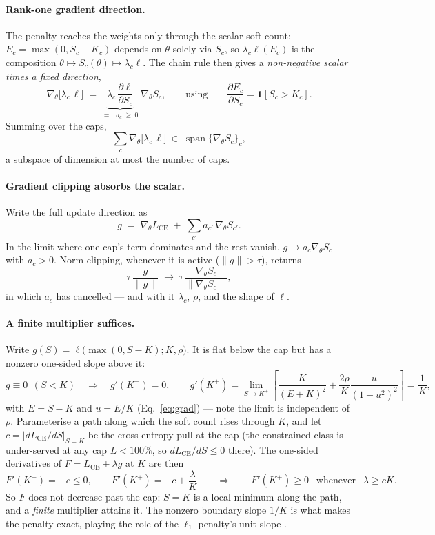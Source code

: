 \documentclass[10pt]{article}
\begin{document}
{\color{blue}
\paragraph{Rank-one gradient direction.}
The penalty reaches the weights only through the scalar soft count:
$E_c=\max(0,S_c-K_c)$ depends on $\theta$ solely via $S_c$, so
$\lambda_c\ell(E_c)$ is the composition
$\theta\mapsto S_c(\theta)\mapsto\lambda_c\ell$. The chain rule then gives a
\emph{non-negative scalar times a fixed direction},
\[
\nabla_\theta\bigl[\lambda_c\,\ell\bigr]
\;=\;
\underbrace{\lambda_c\,\frac{\partial\ell}{\partial S_c}}_{=:\;a_c\;\ge\;0}
\;\nabla_\theta S_c ,
\qquad\text{using}\qquad
\frac{\partial E_c}{\partial S_c}=\mathbf 1[S_c>K_c] .
\]
Summing over the caps,
\[
\sum_c \nabla_\theta\bigl[\lambda_c\,\ell\bigr]
\;\in\;
\operatorname{span}\{\nabla_\theta S_c\}_c ,
\]
a subspace of dimension at most the number of caps.
}

{\color{blue}
\paragraph{Gradient clipping absorbs the scalar.}
Write the full update direction as
\[
g \;=\; \nabla_\theta L_{\text{CE}} \;+\; \sum_{c'} a_{c'}\,\nabla_\theta S_{c'} .
\]
In the limit where one cap's term dominates and the rest vanish, $g\to a_c\nabla_\theta S_c$
with $a_c>0$. Norm-clipping, whenever it is active ($\lVert g\rVert>\tau$), returns
\[
\tau\,\frac{g}{\lVert g\rVert}
\;\longrightarrow\;
\tau\,\frac{\nabla_\theta S_c}{\lVert\nabla_\theta S_c\rVert},
\]
in which $a_c$ has cancelled --- and with it $\lambda_c$, $\rho$, and the shape of $\ell$.
}

{\color{blue}
\paragraph{A finite multiplier suffices.}
Write $g(S)=\ell\bigl(\max(0,S{-}K);K,\rho\bigr)$. It is flat below the cap but has a
nonzero one-sided slope above it:
\[
g\equiv 0 \ \ (S<K)
\quad\Longrightarrow\quad
g'(K^-)=0,
\qquad
g'(K^+)=\lim_{S\to K^+}\left[\frac{K}{(E+K)^{2}}+\frac{2\rho}{K}\frac{u}{(1+u^{2})^{2}}\right]
=\frac{1}{K},
\]
with $E=S-K$ and $u=E/K$ (Eq.~\eqref{eq:grad}) --- note the limit is independent of $\rho$.
Parameterise a path along which the soft count rises through $K$, and let
$c=\lvert dL_{\text{CE}}/dS\rvert_{S=K}$ be the cross-entropy pull at the cap (the
constrained class is under-served at any cap $L<100\%$, so $dL_{\text{CE}}/dS\le0$ there).
The one-sided derivatives of $F=L_{\text{CE}}+\lambda g$ at $K$ are then
\[
F'(K^-)=-c\le 0,
\qquad
F'(K^+)=-c+\frac{\lambda}{K}
\qquad\Longrightarrow\qquad
F'(K^+)\ge 0
\ \ \text{ whenever }\ \
\lambda\ge cK .
\]
So $F$ does not decrease past the cap: $S{=}K$ is a local minimum along the path, and a
\emph{finite} multiplier attains it. The nonzero boundary slope $1/K$ is what makes the
penalty exact, playing the role of the $\ell_1$ penalty's unit slope
\citep{nocedal2006numerical}.
}
\end{document}
